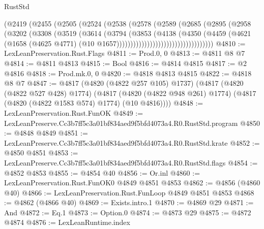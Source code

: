\begin{lexlean}{RustStd}
\begin{coremodule}
                              (@2419
                                (@2455
                                  (@2505
                                    (@2524
                                      (@2538
                                        (@2578
                                          (@2589
                                            (@2685
                                              (@2895
                                                (@2958
                                                  (@3202
                                                    (@3308
                                                      (@3519
                                                        (@3614
                                                          (@3794
                                                            (@3853
                                                              (@4138
                                                                (@4350
                                                                  (@4459
                                                                    (@4621
                                                                      (@1658
                                                                        (@4625 @4771)
                                                                        (@10
                                                                          @1657)))))))))))))))))))))))))))))))))))
@4810 := LexLeanPreservation.Rust.Flags
@4811 := Prod.{0, 0}
@4813 := @4811 @8 @7
@4814 := @4811 @4813
@4815 := Bool
@4816 := @4814 @4815
@4817 := @2 @4816
@4818 := Prod.mk.{0, 0}
@4820 := @4818 @4813 @4815
@4822 := @4818 @8 @7
@4847 := @4817
    (@4820 (@4822 @257 @105) @1737)
    (@4817
      (@4820 (@4822 @527 @428) @1774)
      (@4817 (@4820 (@4822 @948 @261) @1774) (@4817 (@4820 (@4822 @1583 @574) @1774) (@10 @4816))))
@4848 := LexLeanPreservation.Rust.FunOK
@4849 := LexLeanPreserve.Cc3b7ff5c3a01bf834aed9f5bfd4073a4.R0.RustStd.program
@4850 := @4848 @4849
@4851 := LexLeanPreserve.Cc3b7ff5c3a01bf834aed9f5bfd4073a4.R0.RustStd.krate
@4852 := @4850 @4851
@4853 := LexLeanPreserve.Cc3b7ff5c3a01bf834aed9f5bfd4073a4.R0.RustStd.flags
@4854 := @4852 @4853
@4855 := @4854 @40
@4856 := Or.inl
@4860 := LexLeanPreservation.Rust.FunOK0 @4849 @4851 @4853
@4862 := @4856 (@4860 @40)
@4866 := LexLeanPreservation.Rust.FunLoop @4849 @4851 @4853
@4868 := @4862 (@4866 @40)
@4869 := Exists.intro.{1}
@4870 := @4869 @29
@4871 := And
@4872 := Eq.{1}
@4873 := Option.{0}
@4874 := @4873 @29
@4875 := @4872 @4874
@4876 := LexLeanRuntime.index

\end{coremodule}
\end{lexlean}
